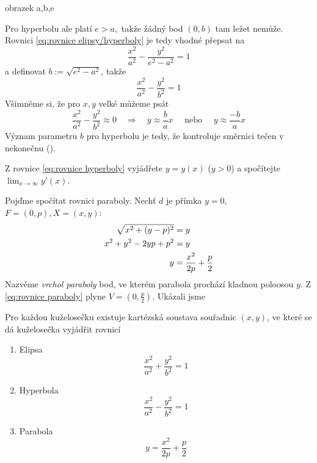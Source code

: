 \begin{Todo}
  obrazek a,b,e
\end{Todo}

Pro hyperbolu ale platí $e>a,$ takže žádný bod $(0,b)$ tam ležet nemůže. Rovnici \ref{eq:rovnice elipsy/hyperboly} je tedy vhodné přepsat na
\begin{equation*}
  \frac{x^{2}}{a^{2}}-\frac{y^{2}}{e^{2}-a^{2}}=1
\end{equation*}
a definovat $b:=\sqrt{e^{2}-a^{2}}$, takže
\begin{equation}\label{eq:rovnice hyperboly}
  \frac{x^{2}}{a^{2}}-\frac{y^{2}}{b^{2}}=1
\end{equation}
Všimněme si, že pro $x,y$ velké můžeme psát
\begin{equation*}
	\frac{x^{2}}{a^{2}}-\frac{y^{2}}{b^{2}}\approx 0\quad \Rightarrow \quad y\approx \frac{b}{a}x\quad \text{ nebo }\quad y\approx \frac{-b}{a}x
\end{equation*}
Význam parametru $b$ pro hyperbolu je tedy, že kontroluje směrnici tečen v nekonečnu ().

\begin{úloha}
	Z rovnice \ref{eq:rovnice hyperboly} vyjádřete $y=y(x)$ ($y>0$) a spočítejte $\lim_{x\to \infty}y'(x).$
\end{úloha}

Pojďme spočítat rovnici paraboly. Nechť $d$ je přímka $y=0$, $F=(0,p), X=(x,y):$
\begin{align}
	\sqrt{x^{2}+(y-p)^{2}}&=y\notag \\
	x^{2}+y^{2}-2yp+p^{2} &= y\notag \\
	y &= \frac{x^{2}}{2p}+\frac{p}{2}\label{eq:rovnice paraboly}
\end{align}
Nazvěme \emph{vrchol paraboly} bod, ve kterém parabola prochází kladnou poloosou $y$. Z \ref{eq:rovnice paraboly} plyne $V=(0,\frac{p}{2}).$ Ukázali jsme

\begin{věta}
Pro každou kuželosečku existuje kartézská soustava souřadnic $(x,y)$, ve které se dá kuželosečka vyjádřit rovnicí
  \begin{enumerate}
	\item Elipsa
		\begin{equation*}
		  \frac{x^{2}}{a^{2}}+\frac{y^{2}}{b^{2}}=1
		\end{equation*}
	\item Hyperbola
		\begin{equation*}
		  \frac{x^{2}}{a^{2}}-\frac{y^{2}}{b^{2}}=1
		\end{equation*}
	\item Parabola
		\begin{equation*}
		  y=\frac{x^{2}}{2p}+\frac{p}{2}
		\end{equation*}
  \end{enumerate}
\end{věta}

